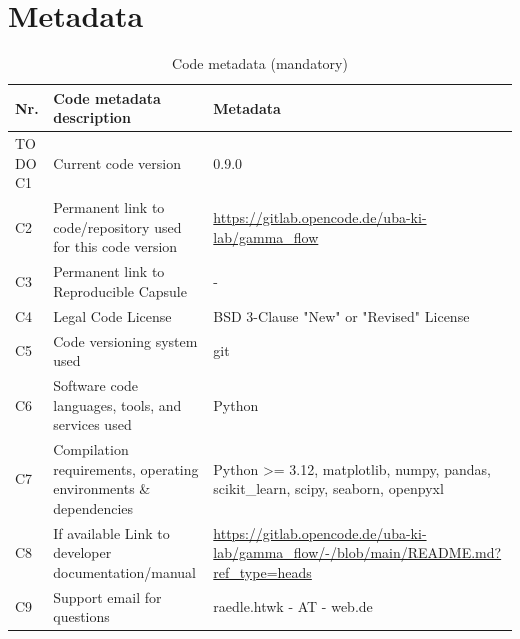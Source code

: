 \documentclass[review, 12pt, a4paper]{elsarticle}
\begin{document}

\section*{Metadata}


\begin{table}[!ht]
\begin{tabular}{|l|p{6.5cm}|p{6.5cm}|}
\hline
\textbf{Nr.} & \textbf{Code metadata description} & \textbf{Metadata} \\
\hline
TO DO C1 & Current code version & 0.9.0 \\
\hline
C2 & Permanent link to code/repository used for this code version & \url{https://gitlab.opencode.de/uba-ki-lab/gamma_flow} \\
\hline
C3  & Permanent link to Reproducible Capsule & - \\
\hline
C4 & Legal Code License & BSD 3-Clause "New" or "Revised" License \\
\hline
C5 & Code versioning system used & git\\
\hline
C6 & Software code languages, tools, and services used & Python \\
\hline
C7 & Compilation requirements, operating environments \& dependencies & Python >= 3.12, matplotlib, numpy, pandas, scikit\_learn, scipy, seaborn, openpyxl \\
\hline
C8 & If available Link to developer documentation/manual & \url{https://gitlab.opencode.de/uba-ki-lab/gamma_flow/-/blob/main/README.md?ref_type=heads} \\
\hline
C9 & Support email for questions & raedle.htwk - AT - web.de\\
\hline
\end{tabular}
\caption{Code metadata (mandatory)}
\label{codeMetadata} 
\end{table}
\end{document}

